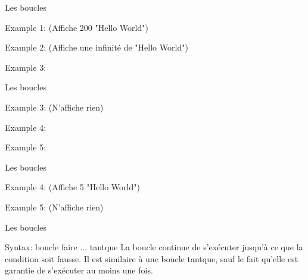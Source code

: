\documentclass{beamer}
\begin{document}
\begin{darkframes}
	
	\begin{frame}{Les boucles}
		\begin{center}
			\begin{minipage}[t]{0.8\linewidth}
				Example 1: (\alert{Affiche 200 "Hello World"})
				\forExmpOne
			\end{minipage}
			\begin{minipage}[t]{0.8\linewidth}
				Example 2: (\alert{Affiche une infinité de "Hello World"})
				\forExmpTwo
			\end{minipage}
			\begin{minipage}[t]{0.8\linewidth}
				Example 3:
				\forExmpThree
			\end{minipage}
		\end{center}
	\end{frame}
	
	\begin{frame}{Les boucles}	
		\begin{minipage}[t]{0.8\linewidth}
			Example 3: (\alert{N'affiche rien})
			\forExmpThree
		\end{minipage}
		\begin{minipage}[t]{0.8\linewidth}
			Example 4:
			\forExmpFour
		\end{minipage}
		\begin{minipage}[t]{0.8\linewidth}
			Example 5:
			\forExmpFive
		\end{minipage}
	\end{frame}

	\begin{frame}{Les boucles}
		\begin{minipage}[t]{0.8\linewidth}
			Example 4:  (\alert{Affiche 5 "Hello World"})
			\forExmpFour
		\end{minipage}
		\begin{minipage}[t]{0.8\linewidth}
			Example 5: (\alert{N'affiche rien})
			\forExmpFive
		\end{minipage}
	\end{frame}

	\begin{frame}{Les boucles}
		\begin{block}{Syntax: boucle faire ... tantque}
			\doWhileSyntax
			La boucle continue de s'exécuter jusqu'à ce que la condition soit \alert{fausse}. 
			Il est similaire à une boucle tantque, sauf le fait qu'elle est garantie de s'exécuter au moins une fois.
		\end{block}
	\end{frame}
	

\end{darkframes}
\end{document}
